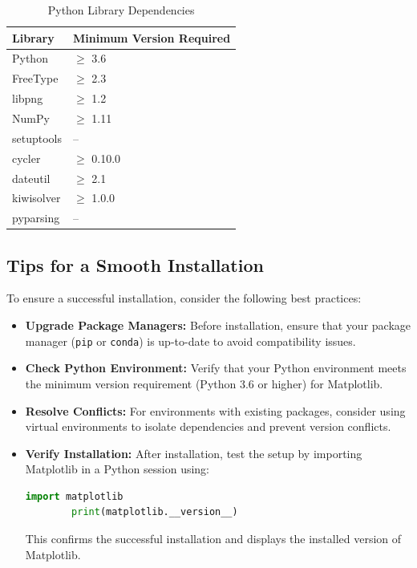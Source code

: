\begin{table}[htbp]
	\centering
	\caption{Python Library Dependencies}
	\label{tab:dependencies}
	\begin{tabular}{|l|l|}
		\hline
		\textbf{Library} & \textbf{Minimum Version Required} \\ \hline
		Python & $\geq$ 3.6 \\ \hline
		FreeType & $\geq$ 2.3 \\ \hline
		libpng & $\geq$ 1.2 \\ \hline
		NumPy & $\geq$ 1.11 \\ \hline
		setuptools & -- \\ \hline
		cycler & $\geq$ 0.10.0 \\ \hline
		dateutil & $\geq$ 2.1 \\ \hline
		kiwisolver & $\geq$ 1.0.0 \\ \hline
		pyparsing & -- \\ \hline
	\end{tabular}
\end{table}

\subsection{Tips for a Smooth Installation}

To ensure a successful installation, consider the following best practices:
\begin{itemize}
	\item \textbf{Upgrade Package Managers:} Before installation, ensure that your package manager (\texttt{pip} or \texttt{conda}) is up-to-date to avoid compatibility issues.
	\item \textbf{Check Python Environment:} Verify that your Python environment meets the minimum version requirement (Python 3.6 or higher) for Matplotlib.
	\item \textbf{Resolve Conflicts:} For environments with existing packages, consider using virtual environments to isolate dependencies and prevent version conflicts.
	\item \textbf{Verify Installation:} After installation, test the setup by importing Matplotlib in a Python session using:
	\begin{lstlisting}[language=Python]
		import matplotlib
		print(matplotlib.__version__)
	\end{lstlisting}
	This confirms the successful installation and displays the installed version of Matplotlib.
\end{itemize}

